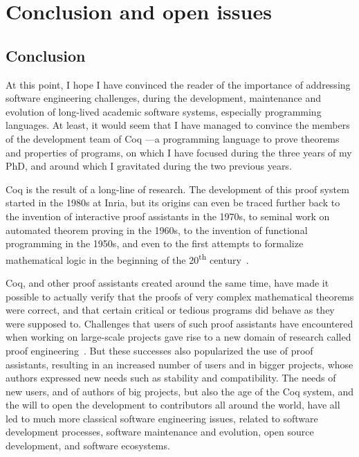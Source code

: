 \chapter{Conclusion and open issues}

\section{Conclusion}

At this point, I hope I have convinced the reader of the importance of addressing software engineering challenges, during the development, maintenance and evolution of long-lived academic software systems, especially programming languages.
At least, it would seem that I have managed to convince the members of the development team of Coq ---a programming language to prove theorems and properties of programs, on which I have focused during the three years of my PhD, and around which I gravitated during the two previous years.

Coq is the result of a long-line of research.
The development of this proof system started in the 1980s at Inria, but its origins can even be traced further back to the invention of interactive proof assistants in the 1970s, to seminal work on automated theorem proving in the 1960s, to the invention of functional programming in the 1950s, and even to the first attempts to formalize mathematical logic in the beginning of the 20\textsuperscript{th} century~\cite{coq_refman}.

Coq, and other proof assistants created around the same time, have made it possible to actually verify that the proofs of very complex mathematical theorems were correct, and that certain critical or tedious programs did behave as they were supposed to.
Challenges that users of such proof assistants have encountered when working on large-scale projects gave rise to a new domain of research called proof engineering~\cite{ringer2019qed}.
But these successes also popularized the use of proof assistants, resulting in an increased number of users and in bigger projects, whose authors expressed new needs such as stability and compatibility.
The needs of new users, and of authors of big projects, but also the age of the Coq system, and the will to open the development to contributors all around the world, have all led to much more classical software engineering issues, related to software development processes, software maintenance and evolution, open source development, and software ecosystems.

